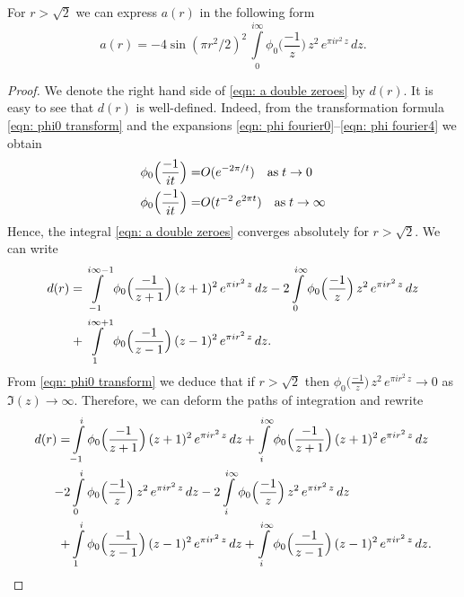 \begin{proposition}
\label{prop: a(r) double zeroes}
For $r>\sqrt{2}$ we can express $a(r)$ in the following form
\begin{equation}\label{eqn: a double zeroes}
  a(r)=-4\sin(\pi r^2/2)^2\,\int\limits_{0}^{i\infty}\phi_0\Big(\frac{-1}{z}\Big)\,z^2\,e^{\pi i r^2 \,z}\,dz.
\end{equation}
\end{proposition}
\begin{proof}
We denote the right hand side of \eqref{eqn: a double zeroes} by $d(r)$.  It is easy to see that $d(r)$ is well-defined. Indeed, from the transformation formula \eqref{eqn: phi0 transform} and the expansions \eqref{eqn: phi fourier0}--\eqref{eqn: phi fourier4} we obtain
\begin{align}
\phi_0\Big(\frac{-1}{it}\Big)=&O(e^{-2\pi/t})\quad\mbox{as}\;t\to 0\notag\\
\phi_0\Big(\frac{-1}{it}\Big)=&O(t^{-2}\,e^{2\pi t})\quad\mbox{as}\;t\to \infty\notag
\end{align}
Hence, the integral \eqref{eqn: a double zeroes} converges absolutely for $r>\sqrt{2}$.
  We can write %
\begin{align}
  d(r)=&\int\limits_{-1}^{i\infty-1}\phi_0\Big(\frac{-1}{z+1}\Big)\,(z+1)^2\,e^{\pi i r^2 \,z}\,dz-
  2\int\limits_{0}^{i\infty}\phi_0\Big(\frac{-1}{z}\Big)\,z^2\,e^{\pi i r^2 \,z}\,dz\notag\\
  +&\int\limits_{1}^{i\infty+1}\phi_0\Big(\frac{-1}{z-1}\Big)\,(z-1)^2\,e^{\pi i r^2 \,z}\,dz.\notag
\end{align}
From \eqref{eqn: phi0 transform} we deduce that if $r>\sqrt{2}$ then
$\phi_0\Big(\frac{-1}{z}\Big)\,z^2\,e^{\pi i r^2 \,z}\to 0$ as $\Im(z)\to\infty$. Therefore, we can deform the paths of integration
and rewrite
\begin{align}
  d(r)=&\int\limits_{-1}^{i}\phi_0\Big(\frac{-1}{z+1}\Big)\,(z+1)^2\,e^{\pi i r^2 \,z}\,dz
  +\int\limits_{i}^{i\infty}\phi_0\Big(\frac{-1}{z+1}\Big)\,(z+1)^2\,e^{\pi i r^2 \,z}\,dz\notag\\
  -2&\int\limits_{0}^{i}\phi_0\Big(\frac{-1}{z}\Big)\,z^2\,e^{\pi i r^2 \,z}\,dz
  -2\int\limits_{i}^{i\infty}\phi_0\Big(\frac{-1}{z}\Big)\,z^2\,e^{\pi i r^2 \,z}\,dz\notag\\
  +&\int\limits_{1}^{i}\phi_0\Big(\frac{-1}{z-1}\Big)\,(z-1)^2\,e^{\pi i r^2 \,z}\,dz
  +\int\limits_{i}^{i\infty}\phi_0\Big(\frac{-1}{z-1}\Big)\,(z-1)^2\,e^{\pi i r^2 \,z}\,dz.\notag

\end{align}
\end{proof}

